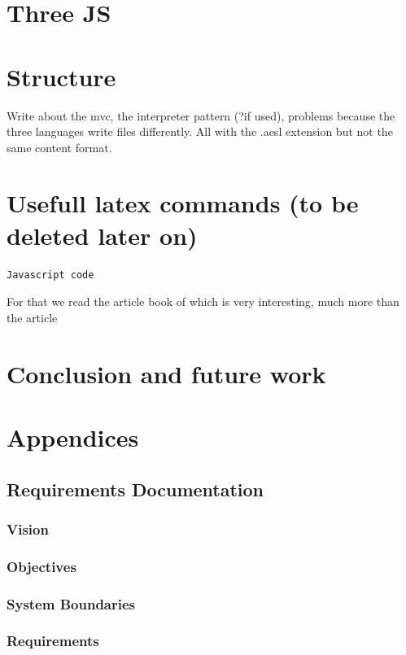 \documentclass{scrartcl}
\begin{document}
\section{Three JS}

\section{Structure}
Write about the mvc, the interpreter pattern (?if used), problems because the three languages write files differently. All with the .aesl extension but not the same content format.

\section{Usefull latex commands (to be deleted later on)}
\begin{lstlisting}[style=JavaScript, caption={JavaScript Listing}]
  Javascript code
\end{lstlisting}
For that we read the article book of \cite{Jerald:2015:VBH:2792790}
which is very interesting, much more than the article
\cite{Diniz:2017:UGO:3100317.3100324}

\section{Conclusion and future work}

\section{Appendices}
\subsection{Requirements Documentation}
\subsubsection{Vision}
\subsubsection{Objectives}
\subsubsection{System Boundaries}
\subsubsection{Requirements}
\end{document}
